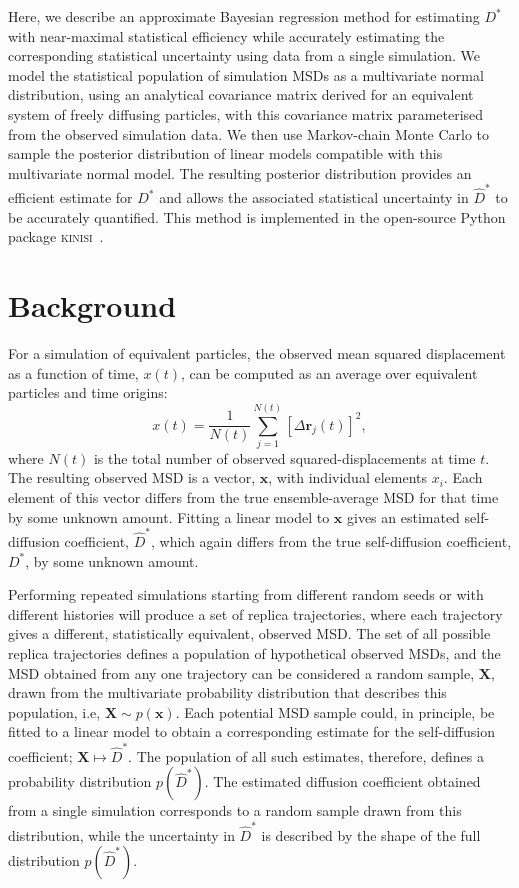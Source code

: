 \documentclass[reprint,superscriptaddress,nobibnotes,amsmath,amssymb,aps,prx,hidelinks]{revtex4-2}
\newcommand{\oMSD}{\ensuremath{\bm{x}}}
\newcommand{\oMSDs}[1]{\ensuremath{x}(#1)}
\newcommand{\oMSDi}{\ensuremath{x_i}}
\newcommand{\prob}[1]{\ensuremath{p(#1)}}
\newcommand{\Dest}{\ensuremath{\widehat{D}^*}}
\newcommand{\D}{\ensuremath{D^*}}
\begin{document}
Here, we describe an approximate Bayesian regression method for estimating $\D$ with near-maximal statistical efficiency while accurately estimating the corresponding statistical uncertainty using data from a single simulation.
We model the statistical population of simulation MSDs as a multivariate normal distribution, using an analytical covariance matrix derived for an equivalent system of freely diffusing particles, with this covariance matrix parameterised from the observed simulation data.
We then use Markov-chain Monte Carlo to sample the posterior distribution of linear models compatible with this multivariate normal model.
The resulting posterior distribution provides an efficient estimate for $\D$ and allows the associated statistical uncertainty in $\Dest$ to be accurately quantified.
This method is implemented in the open-source Python package \textsc{kinisi}~\cite{McCluskey2024}.

\section{Background}

For a simulation of equivalent particles, the observed mean squared displacement as a function of time, $\oMSDs{t}$, can be computed as an average over equivalent particles and time origins:
\begin{equation}
  \oMSDs{t} = \frac{1}{N(t)}\sum^{N(t)}_{j=1}{\left[\Delta\mathbf{r}_j(t)\right]}^2,
  \label{equ:observed_msd}
\end{equation}
where $N(t)$ is the total number of observed squared-displacements at time $t$.
The resulting observed MSD is a vector, $\oMSD$, with individual elements $\oMSDi$.
Each element of this vector differs from the true ensemble-average MSD for that time by some unknown amount.
Fitting a linear model to $\oMSD$ gives an estimated self-diffusion coefficient, $\Dest$, which again differs from the true self-diffusion coefficient, $\D$, by some unknown amount.

Performing repeated simulations starting from different random seeds or with different histories will produce a set of replica trajectories, where each trajectory gives a different, statistically equivalent, observed MSD.
The set of all possible replica trajectories defines a population of hypothetical observed MSDs, and the MSD obtained from any one trajectory can be considered a random sample, $\bm{X}$, drawn from the multivariate probability distribution that describes this population, i.e, $\bm{X} \sim \prob{\oMSD}$.
Each potential MSD sample could, in principle, be fitted to a linear model to obtain a corresponding estimate for the self-diffusion coefficient; $\bm{X} \mapsto \Dest$.
The population of all such estimates, therefore, defines a probability distribution $\prob{\Dest}$.
The estimated diffusion coefficient obtained from a single simulation corresponds to a random sample drawn from this distribution, while the uncertainty in $\Dest$ is described by the shape of the full distribution $\prob{\Dest}$.
\end{document}
